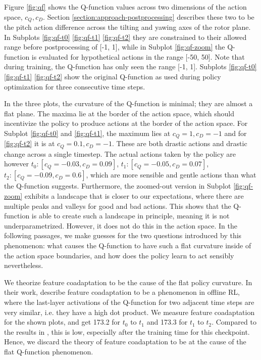 Figure \ref{fig:qf} shows the Q-function values across two dimensions of the action space, $c_Q, c_D$. Section \ref{section:approach-postprocessing} describes these two to be the pitch action difference across the tilting and yawing axes of the rotor plane. In Subplots \ref{fig:qf-t0} \ref{fig:qf-t1} \ref{fig:qf-t2} they are constrained to their allowed range before postprocessing of [-1, 1], while in Subplot \ref{fig:qf-zoom} the Q-function is evaluated for hypothetical actions in the range [-50, 50]. Note that during training, the Q-function has only seen the range [-1, 1]. Subplots \ref{fig:qf-t0} \ref{fig:qf-t1} \ref{fig:qf-t2} show the original Q-function as used during policy optimization for three consecutive time steps.

In the three plots, the curvature of the Q-function is minimal; they are almost a flat plane. The maxima lie at the border of the action space, which should incentivize the policy to produce actions at the border of the action space. For Subplot \ref{fig:qf-t0} and \ref{fig:qf-t1}, the maximum lies at $c_Q=1, c_D=-1$ and for \ref{fig:qf-t2} it is at $c_Q=0.1, c_D=-1$. These are both drastic actions and drastic change across a single timestep. The actual actions taken by the policy are however $t_0: [c_Q=-0.03, c_D=0.09]$, $t_1: [c_Q=-0.05, c_D=0.07]$, $t_2: [c_Q=-0.09, c_D=0.6]$, which are more sensible and gentle actions than what the Q-function suggests. Furthermore, the zoomed-out version in Subplot \ref{fig:qf-zoom} exhibits a landscape that is closer to our expectations, where there are multiple peaks and valleys for good and bad actions. This shows that the Q-function is able to create such a landscape in principle, meaning it is not underparametrized. However, it does not do this in the action space. In the following passages, we make guesses for the two questions introduced by this phenomenon: what causes the Q-function to have such a flat curvature inside of the action space boundaries, and how does the policy learn to act sensibly nevertheless.

We theorize feature coadaptation \cite{kumarDR3ValueBasedDeep2021} to be the cause of the flat policy curvature. In their work, \citet{kumarDR3ValueBasedDeep2021} describe feature coadaptation to be a phenomenon in offline RL, where the last-layer activations of the Q-function for two adjacent time steps are very similar, i.e. they have a high dot product. We measure feature coadaptation for the shown plots, and get 173.2 for $t_0$ to $t_1$ and 173.3 for $t_1$ to $t_2$. Compared to the results in \cite{kumarDR3ValueBasedDeep2021}, this is low, especially after the training time for this checkpoint. Hence, we discard the theory of feature coadaptation to be at the cause of the flat Q-function phenomenon.

